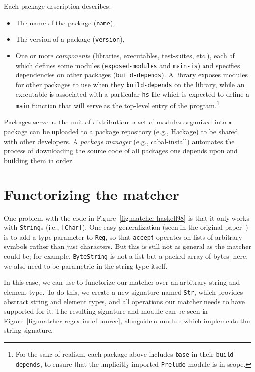 Each package description describes:

\begin{itemize}
    \item The name of the package (\verb|name|),
    \item The version of a package (\verb|version|),
    \item One or more \emph{components} (libraries, executables,
    test-suites, etc.), each of which defines some modules
    (\verb|exposed-modules| and \verb|main-is|) and specifies
    dependencies on other packages (\verb|build-depends|).
    A library exposes modules for other packages to use when
    they \verb|build-depends| on the library, while an
    executable is associated with a particular \verb|hs| file
    which is expected to define a \verb|main| function that
    will serve as the top-level entry of the program.\footnote{For the
    sake of realism, each package above includes \texttt{base} in their
    \texttt{build-depends}, to ensure that the implicitly imported
    \texttt{Prelude} module is in scope.}
\end{itemize}

Packages serve as the unit of distribution: a set of modules organized
into a package can be uploaded to a package repository (e.g., Hackage)
to be shared with other developers.  A \emph{package
manager} (e.g., cabal-install) automates the process of downloading the source code of all
packages one depends upon and building them in order.

\section{Functorizing the matcher}

One problem with the code in Figure~\ref{fig:matcher-haskell98} is that
it only works with \verb|String|s (i.e., \verb|[Char]|).  One easy
generalization (seen in the original
paper~\cite{Fischer:2010:PRE:1863543.1863594}) is to add a type
parameter to \verb|Reg|, so that \verb|accept| operates on lists of
arbitrary symbols rather than just characters.  But this is still not as
general as the matcher could be; for example,
\verb|ByteString| is not a list but a packed array of bytes; here,
we also need to be parametric in the string type itself.

In this case, we can use \Backpack{} to functorize our matcher over an
arbitrary string and element type.  To do this, we create a new
signature named \verb|Str|, which provides abstract string and element
types, and all operations our matcher needs to have supported for it.
The resulting signature and module can be seen in
Figure~\ref{fig:matcher-regex-indef-source}, alongside a module which
implements the string signature.

